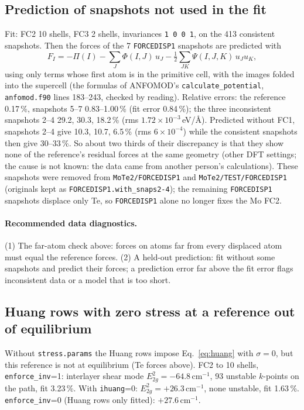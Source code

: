 \documentclass[11pt,a4paper]{article}
\newcommand{\code}[1]{\texttt{#1}}
\begin{document}
\subsection{Prediction of snapshots not used in the fit}
Fit: FC2 10 shells, FC3 2 shells, invariances \code{1 0 0 1}, on the 413 consistent snapshots. Then the forces of the 7
\code{FORCEDISP1} snapshots are predicted with
\begin{equation}
F_I=-\Pi(I)-\sum_J\Phi(I,J)\,u_J-\tfrac12\sum_{JK}\Psi(I,J,K)\,u_Ju_K ,
\end{equation}
using only terms whose first atom is in the primitive cell, with the images folded into the supercell (the formulas of
ANFOMOD's \code{calculate\_potential}, \code{anfomod.f90} lines 183--243, checked by reading). Relative errors: the reference
0.17\,\%, snapshots 5--7 0.83--1.00\,\% (fit error 0.84\,\%); the three inconsistent snapshots 2--4 29.2, 30.3, 18.2\,\%
(rms $1.72\times10^{-3}$\,eV/\AA). Predicted without FC1, snapshots 2--4 give 10.3, 10.7, 6.5\,\% (rms $6\times10^{-4}$) while the
consistent snapshots then give 30--33\,\%. So about two thirds of their discrepancy is that they show none of the
reference's residual forces at the same geometry (other DFT settings; the cause is not known: the data came from
another person's calculations). These snapshots were removed from \code{MoTe2/FORCEDISP1} and \code{MoTe2/TEST/FORCEDISP1}
(originals kept as \code{FORCEDISP1.with\_snaps2-4}); the remaining \code{FORCEDISP1} snapshots displace only Te, so
\code{FORCEDISP1} alone no longer fixes the Mo FC2.

\paragraph{Recommended data diagnostics.} (1) The far-atom check above: forces on atoms far from every displaced atom
must equal the reference forces. (2) A held-out prediction: fit without some snapshots and predict their forces; a
prediction error far above the fit error flags inconsistent data or a model that is too short.

\subsection{Huang rows with zero stress at a reference out of equilibrium}
Without \code{stress.params} the Huang rows impose Eq.~\eqref{eq:huang} with $\sigma=0$, but this reference
is not at equilibrium (Te forces above). FC2 to 10 shells, \code{enforce\_inv}=1: interlayer shear mode
$E_{2g}^2=-64.8$\,cm$^{-1}$, 93 unstable $k$-points on the path, fit 3.23\,\%. With \code{ihuang}=0:
$E_{2g}^2=+26.3$\,cm$^{-1}$, none unstable, fit 1.63\,\%. \code{enforce\_inv}=0 (Huang rows only fitted):
$+27.6$\,cm$^{-1}$.
\end{document}
